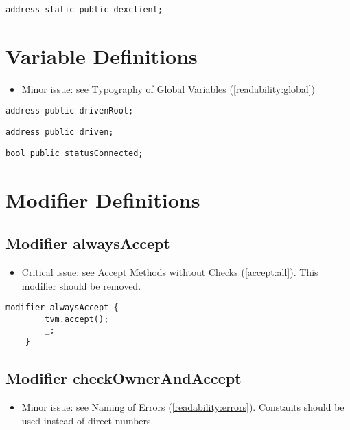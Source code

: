 \begin{lstlisting}[firstnumber=16]
  address static public dexclient;
\end{lstlisting}

\section{Variable Definitions}

\begin{itemize}
\item Minor issue: see Typography of Global Variables (\ref{readability:global})
\end{itemize}

\begin{lstlisting}[firstnumber=22]
  address public drivenRoot;
\end{lstlisting}

\begin{lstlisting}[firstnumber=23]
  address public driven;
\end{lstlisting}

\begin{lstlisting}[firstnumber=24]
  bool public statusConnected;
\end{lstlisting}

\section{Modifier Definitions}

\subsection{Modifier alwaysAccept}

\begin{itemize}
\item Critical issue: see Accept Methods withtout Checks (\ref{accept:all}).
  This modifier should be removed.
\end{itemize}

\begin{lstlisting}[firstnumber=27]
	modifier alwaysAccept {
		tvm.accept();
		_;
	}
\end{lstlisting}

\subsection{Modifier checkOwnerAndAccept}

\begin{itemize}
\item Minor issue: see Naming of Errors
  (\ref{readability:errors}). Constants should be used instead of
  direct numbers.
\end{itemize}

